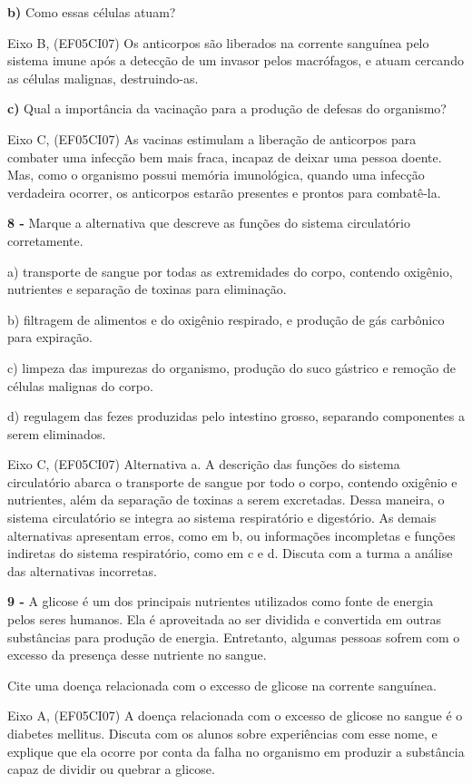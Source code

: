 \textbf{b)} Como essas células atuam?

Eixo B, (EF05CI07) Os anticorpos são liberados na corrente sanguínea
pelo sistema imune após a detecção de um invasor pelos macrófagos, e
atuam cercando as células malignas, destruindo-as.

\textbf{c)} Qual a importância da vacinação para a produção de defesas
do organismo?

Eixo C, (EF05CI07) As vacinas estimulam a liberação de anticorpos para
combater uma infecção bem mais fraca, incapaz de deixar uma pessoa
doente. Mas, como o organismo possui memória imunológica, quando uma
infecção verdadeira ocorrer, os anticorpos estarão presentes e prontos
para combatê-la.

\textbf{8 -} Marque a alternativa que descreve as funções do sistema
circulatório corretamente.

a) transporte de sangue por todas as extremidades do corpo, contendo
oxigênio, nutrientes e separação de toxinas para eliminação.

b) filtragem de alimentos e do oxigênio respirado, e produção de gás
carbônico para expiração.

c) limpeza das impurezas do organismo, produção do suco gástrico e
remoção de células malignas do corpo.

d) regulagem das fezes produzidas pelo intestino grosso, separando
componentes a serem eliminados.

Eixo C, (EF05CI07) Alternativa a. A descrição das funções do sistema
circulatório abarca o transporte de sangue por todo o corpo, contendo
oxigênio e nutrientes, além da separação de toxinas a serem excretadas.
Dessa maneira, o sistema circulatório se integra ao sistema respiratório
e digestório. As demais alternativas apresentam erros, como em b, ou
informações incompletas e funções indiretas do sistema respiratório,
como em c e d. Discuta com a turma a análise das alternativas
incorretas.

\textbf{9 -} A glicose é um dos principais nutrientes utilizados como
fonte de energia pelos seres humanos. Ela é aproveitada ao ser dividida
e convertida em outras substâncias para produção de energia. Entretanto,
algumas pessoas sofrem com o excesso da presença desse nutriente no
sangue.

Cite uma doença relacionada com o excesso de glicose na corrente
sanguínea.

Eixo A, (EF05CI07) A doença relacionada com o excesso de glicose no
sangue é o diabetes mellitus. Discuta com os alunos sobre experiências
com esse nome, e explique que ela ocorre por conta da falha no organismo
em produzir a substância capaz de dividir ou quebrar a glicose.

